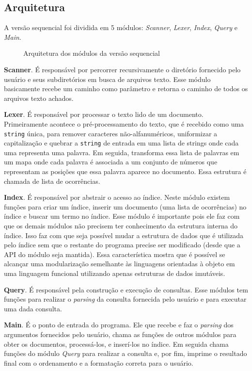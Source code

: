 \subsection{Arquitetura}

A versão sequencial foi dividida em 5 módulos: \emph{Scanner}, \emph{Lexer}, \emph{Index}, \emph{Query} e \emph{Main}. 

\begin{figure}[h]
 \centering
 \def\svgwidth{0.5\columnwidth}
 
 \caption{Arquitetura dos módulos da versão sequencial}
\end{figure}

\textbf{Scanner}. É responsável por percorrer recursivamente o diretório fornecido pelo usuário e seus subdiretórios em busca de arquivos texto. Esse módulo basicamente recebe um caminho como parâmetro e retorna o caminho de todos os arquivos texto achados.

\textbf{Lexer}. É responsável por processar o texto lido de um documento. Primeiramente acontece o pré-processamento do texto, que é recebido como uma \verb|string| única, para remover caracteres não-alfanuméricos, uniformizar a capitalização e quebrar a \verb|string| de entrada em uma lista de strings onde cada uma representa uma palavra. Em seguida, transforma essa lista de palavras em um mapa onde cada palavra é associada a um conjunto de números que representam as posições que essa palavra aparece no documento. Essa estrutura é chamada de lista de ocorrências.

\textbf{Index}. É responsável por abstrair o acesso ao índice. Neste módulo existem funções para criar um índice, inserir um documento (uma lista de ocorrências) no índice e buscar um termo no índice. Esse módulo é importante pois ele faz com que os demais módulos não precisem ter conhecimento da estrutura interna do índice. Isso faz com que seja possível mudar a estrutura de dados que é utilizada pelo índice sem que o restante do programa precise ser modificado (desde que a API do módulo seja mantida). Essa característica mostra que é possível se alcançar uma modularização semelhante às linguagens orientadas à objeto em uma linguagem funcional utilizando apenas estruturas de dados imutáveis.

\textbf{Query}. É responsável pela construção e execução de consultas. Esse módulos tem funções para realizar o \emph{parsing} da consulta fornecida pelo usuário e para executar uma dada consulta.

\textbf{Main}. É o ponto de entrada do programa. Ele que recebe e faz o \emph{parsing} dos argumentos fornecidos pelo usuário, chama as funções de outros módulos para obter os documentos, processá-los, e inserí-los no índice. Em seguida chama funções do módulo \emph{Query} para realizar a consulta e, por fim, imprime o resultado final com o ordenamento e a formatação correta para o usuário.


